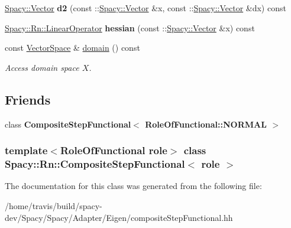 \begin{DoxyCompactItemize}
\item 
\hypertarget{classSpacy_1_1Rn_1_1CompositeStepFunctional_aa049e713c6bc06fc271257af31c536c7}{\hyperlink{classSpacy_1_1Vector}{\-Spacy\-::\-Vector} {\bfseries d2} (const \-::\hyperlink{classSpacy_1_1Vector}{\-Spacy\-::\-Vector} \&x, const \-::\hyperlink{classSpacy_1_1Vector}{\-Spacy\-::\-Vector} \&dx) const }\label{classSpacy_1_1Rn_1_1CompositeStepFunctional_aa049e713c6bc06fc271257af31c536c7}

\item 
\hypertarget{classSpacy_1_1Rn_1_1CompositeStepFunctional_a0f406c3e04f4374a2e0bfac66ed99fe8}{\hyperlink{classSpacy_1_1Rn_1_1LinearOperator}{\-Spacy\-::\-Rn\-::\-Linear\-Operator} {\bfseries hessian} (const \-::\hyperlink{classSpacy_1_1Vector}{\-Spacy\-::\-Vector} \&x) const }\label{classSpacy_1_1Rn_1_1CompositeStepFunctional_a0f406c3e04f4374a2e0bfac66ed99fe8}

\item 
\hypertarget{classSpacy_1_1FunctionalBase_a2d3397deb9fa1ad85ed04e37a03b3aa6}{const \hyperlink{classSpacy_1_1VectorSpace}{\-Vector\-Space} \& \hyperlink{classSpacy_1_1FunctionalBase_a2d3397deb9fa1ad85ed04e37a03b3aa6}{domain} () const }\label{classSpacy_1_1FunctionalBase_a2d3397deb9fa1ad85ed04e37a03b3aa6}

\begin{DoxyCompactList}\small\item\em \-Access domain space $X$. \end{DoxyCompactList}\end{DoxyCompactItemize}
\subsection*{\-Friends}
\begin{DoxyCompactItemize}
\item 
\hypertarget{classSpacy_1_1Rn_1_1CompositeStepFunctional_ab4d23f390bcf90bf58fd77a6dadc9f7e}{class {\bfseries \-Composite\-Step\-Functional$<$ Role\-Of\-Functional\-::\-N\-O\-R\-M\-A\-L $>$}}\label{classSpacy_1_1Rn_1_1CompositeStepFunctional_ab4d23f390bcf90bf58fd77a6dadc9f7e}

\end{DoxyCompactItemize}
\subsubsection*{template$<$\-Role\-Of\-Functional role$>$ class Spacy\-::\-Rn\-::\-Composite\-Step\-Functional$<$ role $>$}



\-The documentation for this class was generated from the following file\-:\begin{DoxyCompactItemize}
\item 
/home/travis/build/spacy-\/dev/\-Spacy/\-Spacy/\-Adapter/\-Eigen/composite\-Step\-Functional.\-hh\end{DoxyCompactItemize}

